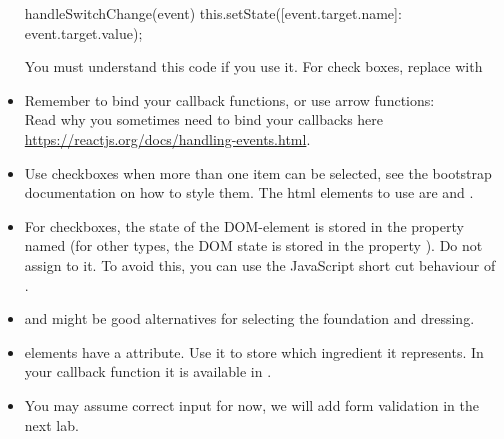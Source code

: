\documentclass[fleqn, article, a4paper]{memoir}
\begin{document}
\begin{Assignments}
\begin{itemize}
\begin{Code}
 handleSwitchChange(event) {
    this.setState({[event.target.name]: event.target.value});
  }
\end{Code}
You must understand this code if you use it. For check boxes, replace  with 
  \item Remember to bind your callback functions, or use arrow functions:\\  Read why you sometimes need to bind your callbacks here \url{https://reactjs.org/docs/handling-events.html}.
  \item Use checkboxes when more than one item can be selected, see the bootstrap documentation on how to style them. The html elements to use are  and .
  \item For checkboxes, the state of the DOM-element is stored in the property named  (for other  types, the DOM state is stored in the property ). Do not assign  to it. To avoid this, you can use the JavaScript short cut behaviour of \code{||} \\ .
  \item {} and  might be good alternatives for selecting the foundation and dressing.
  \item {} elements have a  attribute. Use it to store which ingredient it represents. In your callback function it is available in .
  \item You may assume correct input for now, we will add form validation in the next lab.
\end{itemize}


\end{Assignments}
\end{document}
